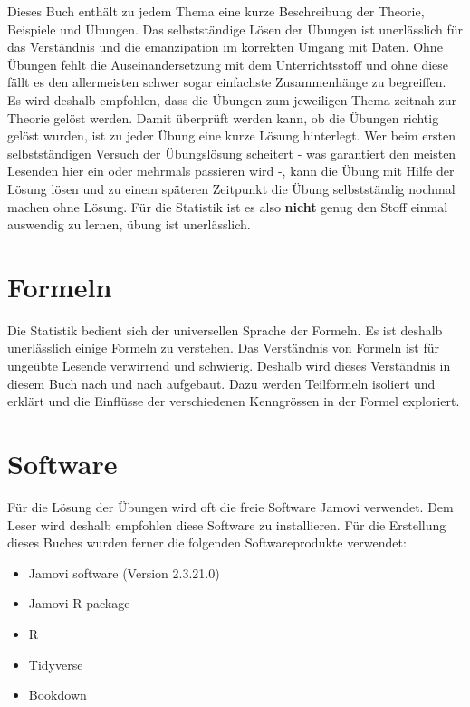 \documentclass[
]{book}
\providecommand{\tightlist}{%
  \setlength{\itemsep}{0pt}\setlength{\parskip}{0pt}}
\theoremstyle{definition}
\theoremstyle{definition}
\theoremstyle{definition}
\theoremstyle{definition}
\theoremstyle{remark}
\begin{document}
Dieses Buch enthält zu jedem Thema eine kurze Beschreibung der Theorie, Beispiele und Übungen. Das selbstständige Lösen der Übungen ist unerlässlich für das Verständnis und die emanzipation im korrekten Umgang mit Daten. Ohne Übungen fehlt die Auseinandersetzung mit dem Unterrichtsstoff und ohne diese fällt es den allermeisten schwer sogar einfachste Zusammenhänge zu begreiffen. Es wird deshalb empfohlen, dass die Übungen zum jeweiligen Thema zeitnah zur Theorie gelöst werden. Damit überprüft werden kann, ob die Übungen richtig gelöst wurden, ist zu jeder Übung eine kurze Lösung hinterlegt. Wer beim ersten selbstständigen Versuch der Übungslösung scheitert - was garantiert den meisten Lesenden hier ein oder mehrmals passieren wird -, kann die Übung mit Hilfe der Lösung lösen und zu einem späteren Zeitpunkt die Übung selbstständig nochmal machen ohne Lösung. Für die Statistik ist es also \textbf{nicht} genug den Stoff einmal auswendig zu lernen, übung ist unerlässlich.

\section{Formeln}\label{formeln}

Die Statistik bedient sich der universellen Sprache der Formeln. Es ist deshalb unerlässlich einige Formeln zu verstehen. Das Verständnis von Formeln ist für ungeübte Lesende verwirrend und schwierig. Deshalb wird dieses Verständnis in diesem Buch nach und nach aufgebaut. Dazu werden Teilformeln isoliert und erklärt und die Einflüsse der verschiedenen Kenngrössen in der Formel exploriert.

\section{Software}\label{software}

Für die Lösung der Übungen wird oft die freie Software Jamovi verwendet. Dem Leser wird deshalb empfohlen diese Software zu installieren. Für die Erstellung dieses Buches wurden ferner die folgenden Softwareprodukte verwendet:

\begin{itemize}
\tightlist
\item
  Jamovi software (Version 2.3.21.0)
\item
  Jamovi R-package \citep{R-jmv}
\item
  R \citep{R-base}
\item
  Tidyverse \citep{tidyverse2019}
\item
  Bookdown \citep{bookdown2016}
\end{itemize}
\end{document}
